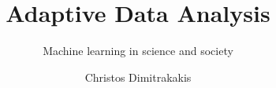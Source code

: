 \documentclass[9pt]{beamer}
\title{Adaptive Data Analysis}
\subtitle{Machine learning in science and society}
\author[C. Dimitrakakis]{Christos Dimitrakakis}
\begin{document}
\begin{frame}
  \titlepage
\end{frame}


  




\end{document}
